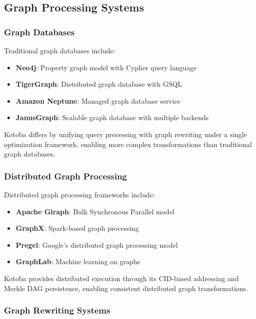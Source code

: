 \documentclass[11pt,a4paper]{article}
\begin{document}
\subsection{Graph Processing Systems}
\label{subsec:graph_systems}

\subsubsection{Graph Databases}
\label{subsubsec:graph_databases}

Traditional graph databases include:
\begin{itemize}
\item \textbf{Neo4j}: Property graph model with Cypher query language
\item \textbf{TigerGraph}: Distributed graph database with GSQL
\item \textbf{Amazon Neptune}: Managed graph database service
\item \textbf{JanusGraph}: Scalable graph database with multiple backends
\end{itemize}

Kotoba differs by unifying query processing with graph rewriting under a single optimization framework, enabling more complex transformations than traditional graph databases.

\subsubsection{Distributed Graph Processing}
\label{subsubsec:distributed_graph}

Distributed graph processing frameworks include:
\begin{itemize}
\item \textbf{Apache Giraph}: Bulk Synchronous Parallel model
\item \textbf{GraphX}: Spark-based graph processing
\item \textbf{Pregel}: Google's distributed graph processing model
\item \textbf{GraphLab}: Machine learning on graphs
\end{itemize}

Kotoba provides distributed execution through its CID-based addressing and Merkle DAG persistence, enabling consistent distributed graph transformations.

\subsubsection{Graph Rewriting Systems}
\label{subsubsec:rewriting_systems}
\end{document}
